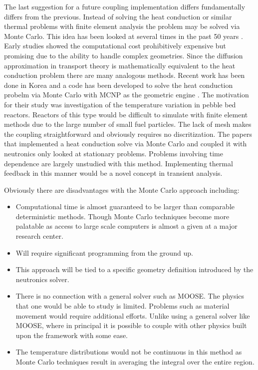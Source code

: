 \documentclass[11pt]{article}
\begin{document}
The last suggestion for a future coupling implementation differs fundamentally differs from the previous.  Instead of solving the heat conduction or similar thermal problems with finite element analysis the problem may be solved via Monte Carlo.  This idea has been looked at several times in the past 50 years\cite{fraley1980monte} \cite{hoffman1976monte} \cite{haji1967solution}.  Early studies showed the computational cost prohibitively  expensive but promising due to the ability to handle complex geometries.  Since the diffusion approximation in transport theory is mathematically equivalent to the heat conduction problem there are many analogous methods. Recent work has been done in Korea and a code has been developed to solve the heat conduction probelm via Monte Carlo with MCNP as the geometric engine  \cite{song2007improved}.  The motivation for their study was investigation of the temperature variation in pebble bed reactors.  Reactors of this type would be difficult to simulate with finite element methods due to the large number of small fuel particles.  The lack of mesh makes the coupling straightforward and obviously requires no discritization. The papers that implemented a heat conduction solve via Monte Carlo and coupled it with neutronics only looked at stationary problems.  Problems involving time dependence are largely unstudied with this method.  Implementing thermal feedback in this manner would be a novel concept in transient analysis.

Obviously there are disadvantages with the Monte Carlo approach including:
	\begin{itemize}
	\item Computational time is almost guaranteed to be larger than comparable deterministic methods.  Though Monte Carlo techniques become more palatable as access to large scale computers is almost a given at a major research center.
	\item Will  require significant programming from the ground up. 
	\item  This approach will be tied to a specific geometry definition introduced by the neutronics solver.  
	\item  There is no connection with a general solver such as MOOSE.  The physics that one would be able to study is limited.  Problems such as material movement would require additional efforts.  Unlike using a general solver like MOOSE, where in principal it is possible to couple with other physics built upon the framework with some ease.
	\item The temperature distributions would not be continuous in this method as Monte Carlo techniques result in averaging the integral over the entire region. 
	\end{itemize}
\end{document}
